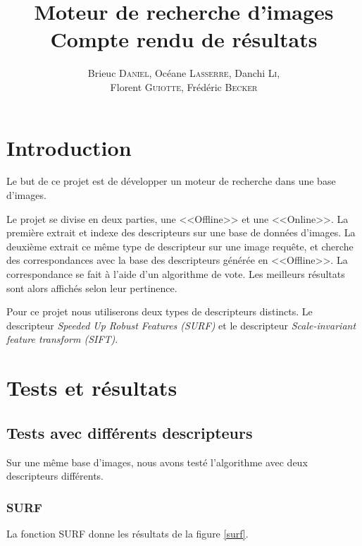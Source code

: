 \documentclass[a4paper]{article}
\author{Brieuc \textsc{Daniel}, Océane \textsc{Lasserre}, Danchi \textsc{Li}, \\ Florent \textsc{Guiotte}, Frédéric \textsc{Becker}}
\title{Moteur de recherche d'images \\ \Large{Compte rendu de résultats}}
\begin{document}
\maketitle
\tableofcontents

\section{Introduction}

Le but de ce projet est de développer un moteur de recherche dans une base d'images. 

Le projet se divise en deux parties, une <<Offline>> et une <<Online>>. La première extrait et indexe des descripteurs sur une base de données
d'images. La deuxième extrait ce même type de descripteur sur une image requête, et cherche des
correspondances avec la base des descripteurs générée en <<Offline>>. La correspondance se fait à l'aide d'un 
algorithme de vote. Les meilleurs résultats sont alors affichés selon leur pertinence. 

Pour ce projet nous utiliserons deux types de descripteurs distincts.
Le descripteur {\em Speeded Up Robust
Features (SURF)} et le descripteur {\em Scale-invariant feature transform (SIFT)}.

\section{Tests et résultats}
\subsection{Tests avec différents descripteurs}

Sur une même base d'images, nous avons testé l'algorithme avec deux descripteurs différents.

\subsubsection{SURF}

La fonction SURF donne les résultats de la figure \ref{surf}.
\end{document}
